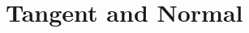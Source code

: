 \documentclass[11pt]{book}
\begin{document}
\section{ Tangent and Normal}

\fi
%

%
%
%
\latexprintindex
\end{document}

